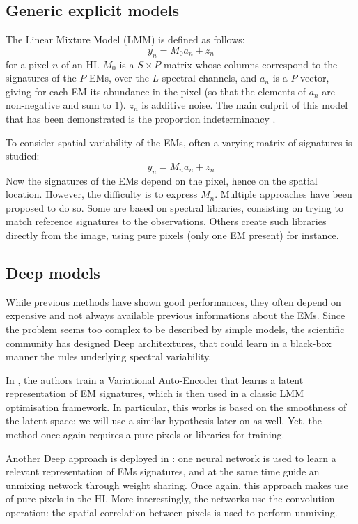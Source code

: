 \documentclass{article}
\begin{document}
\subsection{Generic explicit models}
The Linear Mixture Model (LMM) is defined as follows:
$$y_n = M_0 a_n + z_n$$
for a pixel $n$ of an HI. $M_0$ is a $S \times P$ matrix whose columns correspond to the signatures of the $P$ EMs, over the $L$ spectral channels, and $a_n$ is a $P$ vector, giving for each EM its abundance in the pixel (so that the elements of $a_n$ are non-negative and sum to $1$). $z_n$ is additive noise. The main culprit of this model that has been demonstrated is the proportion indeterminancy \citep{borsoi_spectral_2020}.

To consider spatial variability of the EMs, often a varying matrix of signatures is studied:
\begin{equation}\label{eq:LMM}
  y_n = M_n a_n + z_n
\end{equation}
Now the signatures of the EMs depend on the pixel, hence on the spatial location. However, the difficulty is to express $M_n$. Multiple approaches have been proposed to do so. Some are based on spectral libraries, consisting on trying to match reference signatures to the observations. Others create such libraries directly from the image, using pure pixels (only one EM present) for instance.

\subsection{Deep models}
While previous methods have shown good performances, they often depend on expensive and not always available previous informations about the EMs. Since the problem seems too complex to be described by simple models, the scientific community has designed Deep architextures, that could learn in a black-box manner the rules underlying spectral variability.

In \citet{borsoi_deep_2019}, the authors train a Variational Auto-Encoder that learns a latent representation of EM signatures, which is then used in a classic LMM optimisation framework. In particular, this works is based on the smoothness of the latent space; we will use a similar hypothesis later on as well. Yet, the method once again requires a pure pixels or libraries for training.

Another Deep approach is deployed in \citet{hong_endmember-guided_2021}: one neural network is used to learn a relevant representation of EMs signatures, and at the same time guide an unmixing network through weight sharing. Once again, this approach makes use of pure pixels in the HI. More interestingly, the networks use the convolution operation: the spatial correlation between pixels is used to perform unmixing.
\end{document}

